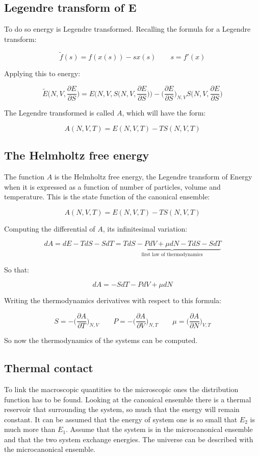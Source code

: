 	\subsection{Legendre transform of E}
	To do so energy is Legendre transformed.
	Recalling the formula for a Legendre transform:

	$$\tilde{f}(s) = f(x(s))-sx(s)\qquad s = f'(x)$$

	Applying this to energy:

	$$\tilde{E}\biggl(N, V, \frac{\partial E}{\partial S}\biggr) = E\biggl(N, V, S\biggl(N, V, \frac{\partial E}{\partial S}\biggr)\biggr)-\biggl(\frac{\partial E}{\partial S}\biggr)_{N, V}S\biggl(N, V, \frac{\partial E}{\partial S}\biggr)$$

	The Legendre transformed is called $A$, which will have the form:

	$$A(N, V, T) = E(N, V, T)-TS(N, V, T)$$

	\subsection{The Helmholtz free energy}
	The function $A$ is the Helmholtz free energy, the Legendre transform of Energy when it is expressed as a function of number of particles, volume and temperature.
	This is the state function of the canonical ensemble:

	$$A(N, V, T) = E(N, V, T)-TS(N, V, T)$$

	Computing the differential of $A$, its infinitesimal variation:

	$$dA = dE - TdS - SdT = \underbrace{TdS - PdV + \mu dN- TdS - SdT}_{\text{first law of thermodynamics}}$$

	So that:

	$$dA = -SdT - PdV +\mu dN$$

	Writing the thermodynamics derivatives with respect to this formula:

	$$S = -\biggl(\frac{\partial A}{\partial T}\biggr)_{N, V}\qquad P = -\biggl(\frac{\partial A}{\partial V}\biggr)_{N, T}\qquad \mu = \biggl(\frac{\partial A}{\partial N}\biggr)_{V, T}$$

	So now the thermodynamics of the systems can be computed.

	\subsection{Thermal contact}
	To link the macroscopic quantities to the microscopic ones the distribution function has to be found.
	Looking at the canonical ensemble there is a thermal reservoir that surrounding the system, so much that the energy will remain constant.
	It can be assumed that the energy of system one is so small that $E_2$ is much more than $E_1$.
	Assume that the system is in the microcanonical ensemble and that the two system exchange energies.
	The universe can be described with the microcanonical ensemble.

